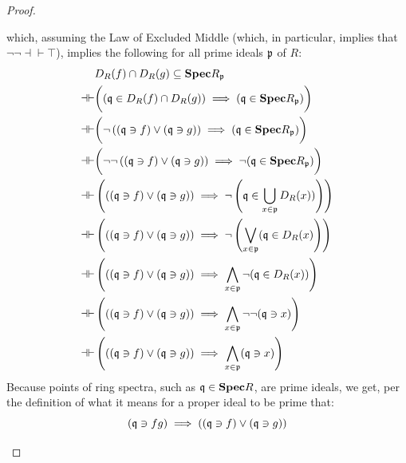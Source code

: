 \begin{proof}
\begin{enumerate}
$$                                    $$
                                which, assuming the Law of Excluded Middle (which, in particular, implies that $\neg \neg \dashv\vdash \top$), implies the following for all prime ideals $\mathfrak{p}$ of $R$:
                                    $$
                                        \begin{aligned}
                                            & D_R(f) \cap D_R(g) \subseteq \mathbf{Spec} R_{\mathfrak{p}}
                                            \\
                                            \dashv\vdash & \bigg((\mathfrak{q} \in D_R(f) \cap D_R(g)) \implies (\mathfrak{q} \in \mathbf{Spec} R_{\mathfrak{p}})\bigg)
                                            \\
                                            \dashv\vdash & \bigg(\neg \left((\mathfrak{q} \ni f) \vee (\mathfrak{q} \ni g)\right) \implies (\mathfrak{q} \in \mathbf{Spec} R_{\mathfrak{p}})\bigg)
                                            \\
                                            \dashv\vdash & \bigg(\neg \neg \left((\mathfrak{q} \ni f) \vee (\mathfrak{q} \ni g)\right) \implies \neg(\mathfrak{q} \in \mathbf{Spec} R_{\mathfrak{p}}) \bigg)
                                            \\
                                            \dashv\vdash & \left(\left((\mathfrak{q} \ni f) \vee (\mathfrak{q} \ni g)\right) \implies \neg\left(\mathfrak{q} \in \bigcup_{x \in \mathfrak{p}} D_R(x))\right) \right)
                                            \\
                                            \dashv\vdash & \left(\left((\mathfrak{q} \ni f) \vee (\mathfrak{q} \ni g)\right) \implies \neg\left(\bigvee_{x \in \mathfrak{p}} (\mathfrak{q} \in D_R(x)\right) \right)
                                            \\
                                            \dashv\vdash & \left(\left((\mathfrak{q} \ni f) \vee (\mathfrak{q} \ni g)\right) \implies \bigwedge_{x \in \mathfrak{p}} \neg(\mathfrak{q} \in D_R(x)) \right)
                                            \\
                                            \dashv\vdash & \left(\left((\mathfrak{q} \ni f) \vee (\mathfrak{q} \ni g)\right) \implies \bigwedge_{x \in \mathfrak{p}} \neg \neg (\mathfrak{q} \ni x) \right)
                                            \\
                                            \dashv\vdash & \left(\left((\mathfrak{q} \ni f) \vee (\mathfrak{q} \ni g)\right) \implies \bigwedge_{x \in \mathfrak{p}} (\mathfrak{q} \ni x) \right)
                                        \end{aligned}
                                    $$
                                Because points of ring spectra, such as $\mathfrak{q} \in \mathbf{Spec} R$, are prime ideals, we get, per the definition of what it means for a proper ideal to be prime that:
                                    $$(\mathfrak{q} \ni fg) \implies \left((\mathfrak{q} \ni f) \vee (\mathfrak{q} \ni g)\right)$$
                                
                            \end{enumerate}
                        \end{proof}
                    
